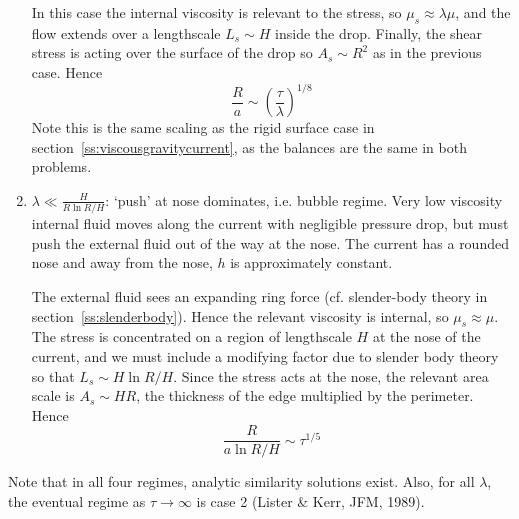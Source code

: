\documentclass{jknotes}
\begin{document}
\begin{enumerate}
\begin{center}
		\end{center}
		In this case the internal viscosity is relevant to the stress, so
		$\mu_s \approx \lambda \mu$, and the flow extends over a lengthscale
		$L_s \sim H$ inside the drop. Finally, the shear stress is acting over
		the surface of the drop so $A_s \sim R^2$ as in the previous case. Hence
		\begin{equation}
			\frac{R}{a} \sim \left( \frac{\tau}{\lambda}\right)^{1/8}
		\end{equation}
		Note this is the same scaling as the rigid surface case in
		section~\ref{ss:viscousgravitycurrent}, as the balances are the same
		in both problems.
	\item $\lambda \ll \frac{H}{R \ln R/H}$: `push' at nose dominates, i.e.
		bubble regime. Very low viscosity internal fluid moves along the
		current with negligible pressure drop, but must push the external
		fluid out of the way at the nose. The current has a rounded nose and
		away from the nose, $h$ is approximately constant.
		\begin{center}
		\end{center}
		The external fluid sees an expanding ring force (cf. slender-body
		theory in section~\ref{ss:slenderbody}). Hence the relevant viscosity
		is internal, so $\mu_s \approx \mu$. The stress is concentrated on a
		region of lengthscale $H$ at the nose of the current, and we must
		include a modifying factor due to slender body theory so that $L_s
		\sim H \ln R/H$. Since the stress acts at the nose, the relevant area
		scale is $A_s \sim HR$, the thickness of the edge multiplied by the
		perimeter. Hence
		\begin{equation}
			\frac{R}{a \ln R/H} \sim \tau^{1/5}
		\end{equation}
\end{enumerate}

Note that in all four regimes, analytic similarity solutions exist. Also, for
all $\lambda$, the eventual regime as $\tau \to \infty$ is case 2 (Lister \&
Kerr, JFM, 1989).
\end{document}
